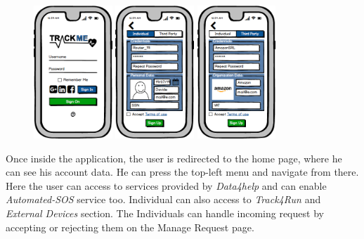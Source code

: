 \documentclass[a4paper]{article}
\begin{document}
\begin{figure}[!htpb]
    	\centering
    	\includegraphics[height=50mm]{images/mockups/Login_Registration.png}
    	\includegraphics[height=50mm]{DD/images/mockups/IndividualRegistration.png}
    	\includegraphics[height=50mm]{images/mockups/ThirdPartyRegistration.png}
        \end{figure}

Once inside the application, the user is redirected to the home page, where he can see his account data. He can press the top-left menu and navigate from there. Here the user can access to services provided by \textit{Data4help} and can enable \textit{Automated-SOS} service too. Individual can also access to \textit{Track4Run} and \textit{External Devices} section. The Individuals can handle incoming request by accepting or rejecting them on the Manage Request page. 
\end{document}

